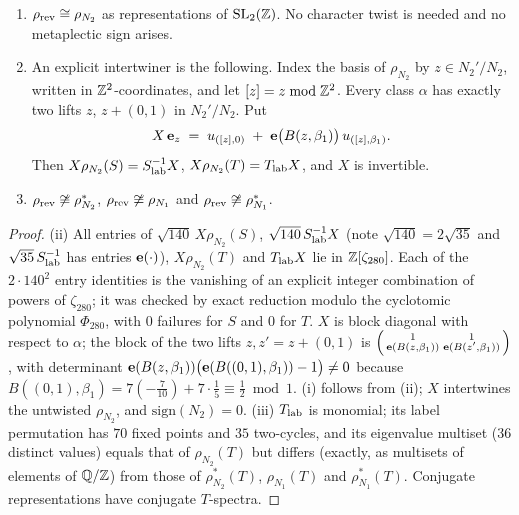 \begin{theorem}\label{thm:weil8}
\begin{enumerate}[label=(\roman*)]
\item $\rho_{\rm rev}\cong\rho_{N_2}$ as representations of $\mathrm{SL}_2(\mathbb{Z})$. No character twist is needed and no metaplectic sign arises.
\item An explicit intertwiner is the following. Index the basis of $\rho_{N_2}$ by $z\in N_2'/N_2$, written in $\mathbb{Z}^2$-coordinates, and let $[z]=z\bmod\mathbb{Z}^2$. Every class $\alpha$ has exactly two lifts $z$, $z+(0,1)$ in $N_2'/N_2$. Put
\[
X\,\mathbf{e}_z\;=\;u_{([z],0)}\;+\;\mathbf{e}\big(B(z,\beta_1)\big)\,u_{([z],\beta_1)} .
\]
Then $X\rho_{N_2}(S)=S_{\rm lab}^{-1}X$, $X\rho_{N_2}(T)=T_{\rm lab}X$, and $X$ is invertible.
\item $\rho_{\rm rev}\not\cong\rho_{N_2}^*$, $\rho_{\rm rev}\not\cong\rho_{N_1}$ and $\rho_{\rm rev}\not\cong\rho_{N_1}^*$.
\end{enumerate}
\end{theorem}
\begin{proof}
(ii) All entries of $\sqrt{140}\,X\rho_{N_2}(S)$, $\sqrt{140}\,S_{\rm lab}^{-1}X$ (note $\sqrt{140}=2\sqrt{35}$ and $\sqrt{35}\,S_{\rm lab}^{-1}$ has entries $\mathbf{e}(\cdot)$), $X\rho_{N_2}(T)$ and $T_{\rm lab}X$ lie in $\mathbb{Z}[\zeta_{280}]$. Each of the $2\cdot140^2$ entry identities is the vanishing of an explicit integer combination of powers of $\zeta_{280}$; it was checked by exact reduction modulo the cyclotomic polynomial $\Phi_{280}$, with $0$ failures for $S$ and $0$ for $T$. $X$ is block diagonal with respect to $\alpha$; the block of the two lifts $z,z'=z+(0,1)$ is $\left(\begin{smallmatrix}1&1\\\mathbf{e}(B(z,\beta_1))&\mathbf{e}(B(z',\beta_1))\end{smallmatrix}\right)$, with determinant $\mathbf{e}(B(z,\beta_1))\big(\mathbf{e}(B((0,1),\beta_1))-1\big)\neq0$ because $B((0,1),\beta_1)=7(-\tfrac7{10})+7\cdot\tfrac15\equiv\tfrac12\bmod1$. (i) follows from (ii); $X$ intertwines the untwisted $\rho_{N_2}$, and $\mathrm{sign}(N_2)=0$.
(iii) $T_{\rm lab}$ is monomial; its label permutation has $70$ fixed points and $35$ two-cycles, and its eigenvalue multiset ($36$ distinct values) equals that of $\rho_{N_2}(T)$ but differs (exactly, as multisets of elements of $\mathbb{Q}/\mathbb{Z}$) from those of $\rho_{N_2}^*(T)$, $\rho_{N_1}(T)$ and $\rho_{N_1}^*(T)$. Conjugate representations have conjugate $T$-spectra.
\end{proof}
